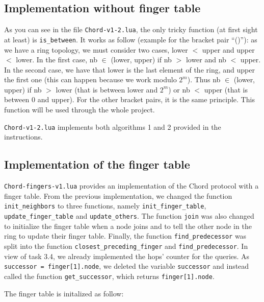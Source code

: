 \documentclass[a4paper, 11pt]{article}
\theoremstyle{plain}
\theoremstyle{definition}
\begin{document}
  \subsection{Implementation without finger table}
  \label{sec:implementation-without-ft}
  
    As you can see in the file \texttt{Chord-v1-2.lua}, the only tricky function (at first sight at least) is
    \texttt{is\_between}. It works as follow (example for the bracket pair ``()''): as we have a ring topology, we
    must consider two cases, lower $<$ upper and upper $<$ lower. In the first case, nb $\in$ (lower, upper)
    if nb $>$ lower and nb $<$ upper. In the second case, we have that lower is the last element of the ring,
    and upper the first one (this can happen because we work modulo $2^m$). Thus nb $\in$ (lower, upper) if nb
    $>$ lower (that is between lower and $2^m$) or nb $<$ upper (that is between $0$ and upper). For the other
    bracket pairs, it is the same principle. This function will be used through the whole project.

    \texttt{Chord-v1-2.lua} implements both algorithms 1 and 2 provided in the instructions.


  \subsection{Implementation of the finger table}
  \label{impl-fing-table}

    \texttt{Chord-fingers-v1.lua} provides an implementation of the Chord protocol with a finger table. From
    the previous implementation, we changed the function \texttt{init\_neighbors} to three functions, namely
    \texttt{init\_finger\_table}, \texttt{update\_finger\_table} and \texttt{update\_others}. The function
    \texttt{join} was also changed to initialize the finger table when a node joins and to tell the other node
    in the ring to update their finger table. Finally, the function \texttt{find\_predecessor} was split into
    the function \texttt{closest\_preceding\_finger} and \texttt{find\_predecessor}. In view of task 3.4, we
    already implemented the hops' counter for the queries. As \texttt{successor = finger[1].node}, we deleted
    the variable \texttt{successor} and instead called the function \texttt{get\_successor}, which returns \texttt{finger[1].node}.

    The finger table is initalized as follow:
    
    \begin{center}
      
    \end{center}
\end{document}
